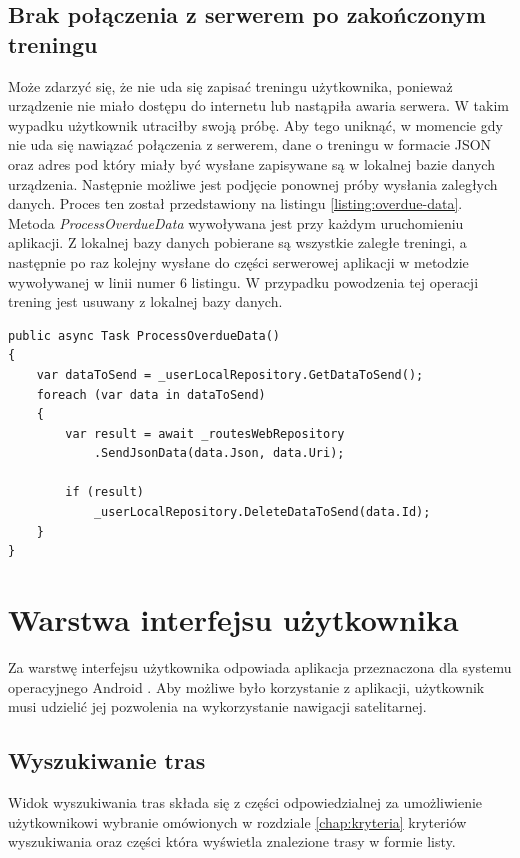 \subsection{Brak połączenia z serwerem po zakończonym treningu}
Może zdarzyć się, że nie uda się zapisać treningu użytkownika, ponieważ urządzenie nie miało dostępu do internetu lub nastąpiła awaria serwera. W takim wypadku użytkownik utraciłby swoją próbę. Aby tego uniknąć, w momencie gdy nie uda się nawiązać połączenia z serwerem, dane o treningu w formacie JSON oraz adres pod który miały być wysłane zapisywane są w lokalnej bazie danych urządzenia. Następnie możliwe jest podjęcie ponownej próby wysłania zaległych danych. Proces ten został przedstawiony na listingu \ref{listing:overdue-data}. Metoda \textit{ProcessOverdueData} wywoływana jest przy każdym uruchomieniu aplikacji. Z lokalnej bazy danych pobierane są wszystkie zaległe treningi, a następnie po raz kolejny wysłane do części serwerowej aplikacji w metodzie wywoływanej w linii numer 6 listingu. W przypadku powodzenia tej operacji trening jest usuwany z lokalnej bazy danych.
\begin{lstlisting}[caption={Wyznaczenie poziomu terenu},label=listing:overdue-data]
public async Task ProcessOverdueData()
{
    var dataToSend = _userLocalRepository.GetDataToSend();
    foreach (var data in dataToSend)
    {
        var result = await _routesWebRepository
        	.SendJsonData(data.Json, data.Uri);

        if (result)
            _userLocalRepository.DeleteDataToSend(data.Id);
    }
}
\end{lstlisting}

\section{Warstwa interfejsu użytkownika}
Za warstwę interfejsu użytkownika odpowiada aplikacja przeznaczona dla systemu operacyjnego Android \cite{Android}. Aby możliwe było korzystanie z aplikacji, użytkownik musi udzielić jej pozwolenia na wykorzystanie nawigacji satelitarnej. 
\subsection{Wyszukiwanie tras}
Widok wyszukiwania tras składa się z części odpowiedzialnej za umożliwienie użytkownikowi wybranie omówionych w rozdziale \ref{chap:kryteria} kryteriów wyszukiwania oraz części która wyświetla znalezione trasy w formie listy.

